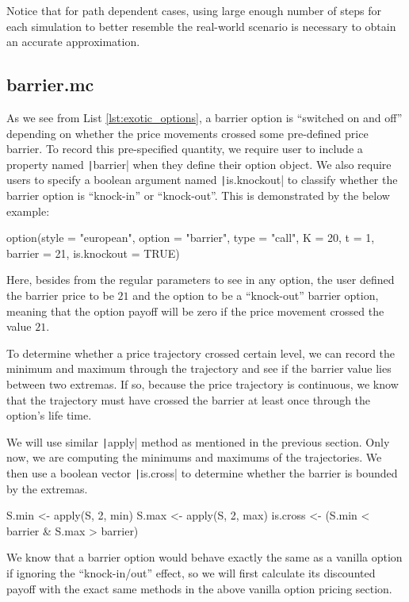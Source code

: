 Notice that for path dependent cases, using large enough number of steps for each simulation to better resemble the real-world scenario is necessary to obtain an accurate approximation.

\subsection{barrier.mc}

As we see from List \ref{lst:exotic_options}, a barrier option is ``switched on and off'' depending on whether the price movements crossed some pre-defined price barrier. To record this pre-specified quantity, we require user to include a property named \texttt|barrier| when they define their option object. We also require users to specify a boolean argument named \texttt|is.knockout| to classify whether the barrier option is ``knock-in'' or ``knock-out''. This is demonstrated by the below example:

\begin{Rminted}
option(style = "european", option = "barrier", type = "call", K = 20, t = 1, barrier = 21, is.knockout = TRUE)
\end{Rminted}

Here, besides from the regular parameters to see in any option, the user defined the barrier price to be $21$ and the option to be a ``knock-out'' barrier option, meaning that the option payoff will be zero if the price movement crossed the value $21$.

To determine whether a price trajectory crossed certain level, we can record the minimum and maximum through the trajectory and see if the barrier value lies between two extremas. If so, because the price trajectory is continuous, we know that the trajectory must have crossed the barrier at least once through the option's life time.

We will use similar \texttt|apply| method as mentioned in the previous section. Only now, we are computing the minimums and maximums of the trajectories. We then use a boolean vector \texttt|is.cross| to determine whether the barrier is bounded by the extremas.

\begin{Rminted}
S.min <- apply(S, 2, min)
S.max <- apply(S, 2, max)
is.cross <- (S.min < barrier & S.max > barrier)
\end{Rminted}

We know that a barrier option would behave exactly the same as a vanilla option if ignoring the ``knock-in/out'' effect, so we will first calculate its discounted payoff with the exact same methods in the above vanilla option pricing section.

